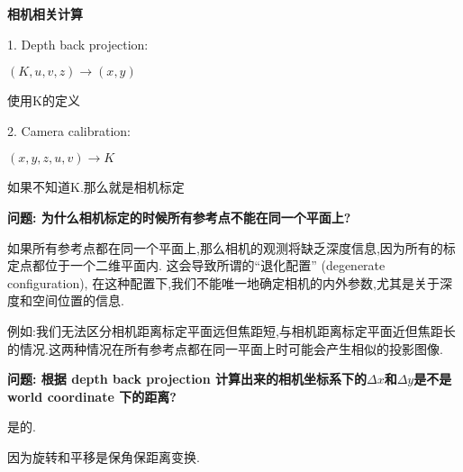 \textbf{相机相关计算}

1. Depth back projection: 

$(K, u, v, z) \rightarrow (x,y)$

使用K的定义

2. Camera calibration:                 

$(x,y,z,u,v) \rightarrow K$

如果不知道K.那么就是相机标定

\textbf{问题: 为什么相机标定的时候所有参考点不能在同一个平面上?}

如果所有参考点都在同一个平面上,那么相机的观测将缺乏深度信息,因为所有的标定点都位于一个二维平面内.
这会导致所谓的“退化配置” (degenerate configuration),
在这种配置下,我们不能唯一地确定相机的内外参数,尤其是关于深度和空间位置的信息.

例如:我们无法区分相机距离标定平面远但焦距短,与相机距离标定平面近但焦距长的情况.这两种情况在所有参考点都在同一平面上时可能会产生相似的投影图像.

\textbf{问题: 根据 depth back projection 计算出来的相机坐标系下的$\Delta x$和$\Delta y$是不是 world coordinate 下的距离?}

是的.

因为旋转和平移是保角保距离变换.
